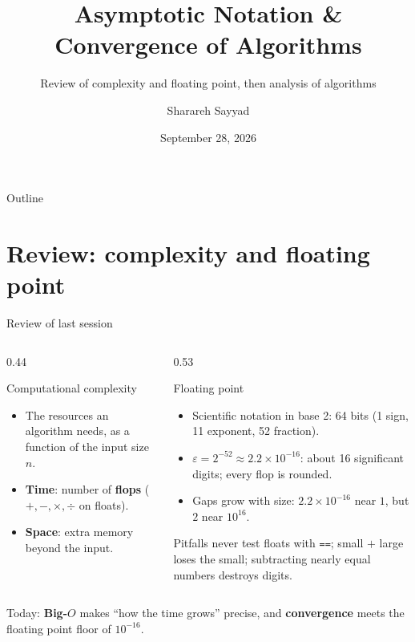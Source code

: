 \documentclass[aspectratio=169]{beamer}
\title{Asymptotic Notation \& Convergence of Algorithms}
\subtitle{Review of complexity and floating point, then analysis of algorithms}
\author{Sharareh Sayyad}
\institute{Washington state University}
\date{September 28, 2026}
\begin{document}
\frame{\titlepage}

\begin{frame}{Outline}
\tableofcontents
\end{frame}

\section{Review: complexity and floating point}

\begin{frame}{Review of last session}
\begin{columns}[T]
\begin{column}{0.44\textwidth}
\begin{block}{Computational complexity}
\small
\begin{itemize}
  \item The resources an algorithm needs, as a function of the input size $n$.
  \item \textbf{Time}: number of \textbf{flops} ($+,-,\times,\div$ on floats).
  \item \textbf{Space}: extra memory beyond the input.
\end{itemize}
\end{block}
\end{column}
\begin{column}{0.53\textwidth}
\begin{block}{Floating point}
\small
\begin{itemize}
  \item Scientific notation in base 2: 64 bits (1 sign, 11 exponent, 52 fraction).
  \item $\varepsilon = 2^{-52} \approx 2.2\times10^{-16}$: about 16 significant digits; every flop is rounded.
  \item Gaps grow with size: $2.2\times10^{-16}$ near $1$, but $2$ near $10^{16}$.
\end{itemize}
\end{block}
\begin{alertblock}{Pitfalls}
\footnotesize never test floats with \texttt{==}; small $+$ large loses the small; subtracting nearly equal numbers destroys digits.
\end{alertblock}
\end{column}
\end{columns}
\vspace{0.2cm}
\centering\scriptsize Today: \textbf{Big-$O$} makes ``how the time grows'' precise, and \textbf{convergence} meets the floating point floor of $10^{-16}$.
\end{frame}
\end{document}

